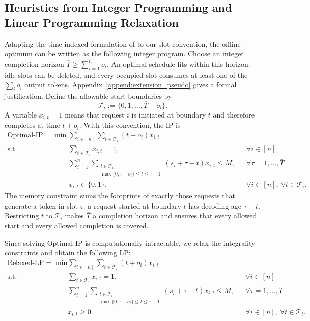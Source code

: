 \documentclass[nonblindrev]{informs3_hide}
\begin{document}
\subsection{Heuristics from Integer Programming and Linear Programming Relaxation}

Adapting the time-indexed formulation of \cite{jaillet2025online} to our slot convention, the offline optimum can be written as the following integer program. Choose an integer completion horizon $\bar T\ge\sum_{i=1}^n o_i$. An optimal schedule fits within this horizon: idle slots can be deleted, and every occupied slot consumes at least one of the $\sum_i o_i$ output tokens. Appendix~\ref{append:extension_pseudo} gives a formal justification. Define the allowable start boundaries by
\[
    \mathcal T_i:=\{0,1,\ldots,\bar T-o_i\}.
\]
A variable $x_{i,t}=1$ means that request $i$ is initiated at boundary $t$ and therefore completes at time $t+o_i$. With this convention, the IP is
\begin{align}
\text{Optimal-IP} = \min\; & \sum_{i \in [n]}\sum_{t\in\mathcal T_i}(t+o_i)x_{i,t}  \label{eq:objective} \\
\text{s.t.}\, 
& \sum_{t\in\mathcal T_i}x_{i,t}=1, && \forall i \in [n] \label{eq:start_once} \\
& \sum_{i=1}^{n}\sum_{\substack{t\in\mathcal T_i\\ \max\{0,\tau-o_i\}\le t\le\tau-1}}(s_i+\tau-t)x_{i,t}\le M, && \forall \tau=1,\ldots,\bar T \label{eq:memory_constraint} \\
& x_{i,t}\in\{0,1\}, && \forall i\in[n],\ \forall t\in\mathcal T_i. \label{eq:integrality}
\end{align}
The memory constraint sums the footprints of exactly those requests that generate a token in slot $\tau$: a request started at boundary $t$ has decoding age $\tau-t$. Restricting $t$ to $\mathcal T_i$ makes $\bar T$ a completion horizon and ensures that every allowed start and every allowed completion is covered.

Since solving Optimal-IP is computationally intractable, we relax the integrality constraints and obtain the following LP:
\begin{align}
\text{Relaxed-LP} = \min\; & \sum_{i \in [n]}\sum_{t\in\mathcal T_i}(t+o_i)x_{i,t}   \\
\text{s.t.}\, 
& \sum_{t\in\mathcal T_i}x_{i,t}=1, && \forall i \in [n]  \\
& \sum_{i=1}^{n}\sum_{\substack{t\in\mathcal T_i\\ \max\{0,\tau-o_i\}\le t\le\tau-1}}(s_i+\tau-t)x_{i,t}\le M, && \forall \tau=1,\ldots,\bar T \label{eq:memory_constraint2} \\
& x_{i,t}\ge0. && \forall i\in[n],\ \forall t\in\mathcal T_i.
\end{align}
\end{document}
